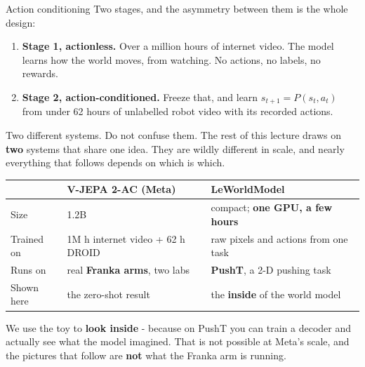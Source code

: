 \documentclass[aspectratio=169]{beamer}
\begin{document}
\begin{frame}{Action conditioning}
  \small
  Two stages, and the asymmetry between them is the whole design:
  \vskip 8pt
  \begin{enumerate}\small
    \item \textbf{Stage 1, actionless.} Over a million hours of internet video. The model
      learns how the world moves, from watching. No actions, no labels, no rewards.
    \item \textbf{Stage 2, action-conditioned.} Freeze that, and learn
      $s_{t+1} = P(s_t, a_t)$ from under 62 hours of unlabelled robot video with its
      recorded actions.
  \end{enumerate}
  \vskip 10pt
  \begin{center}
  \end{center}
\end{frame}

\begin{frame}{Two different systems. Do not confuse them.}
  \small
  The rest of this lecture draws on \textbf{two} systems that share one idea. They are
  wildly different in scale, and nearly everything that follows depends on which is which.
  \vskip 8pt
  \begin{center}
  \scriptsize
  \begin{tabular}{@{}p{2.4cm}p{4.6cm}p{5.2cm}@{}}
    & \textbf{V-JEPA 2-AC} (Meta) & \textbf{LeWorldModel} \\[2pt]
    \hline\rule{0pt}{2.6ex}
    Size & 1.2B & compact; \textbf{one GPU, a few hours} \\[4pt]
    Trained on & 1M h internet video + 62 h DROID & raw pixels and actions from one task \\[4pt]
    Runs on & real \textbf{Franka arms}, two labs & \textbf{PushT}, a 2-D pushing task \\[4pt]
    Shown here & the zero-shot result & the \textbf{inside} of the world model \\
  \end{tabular}
  \end{center}
  \vskip 8pt
  \footnotesize
  We use the toy to \textbf{look inside} - because on PushT you can train a decoder and
  actually see what the model imagined. That is not possible at Meta's scale, and the
  pictures that follow are \textbf{not} what the Franka arm is running.
\end{frame}
\end{document}
